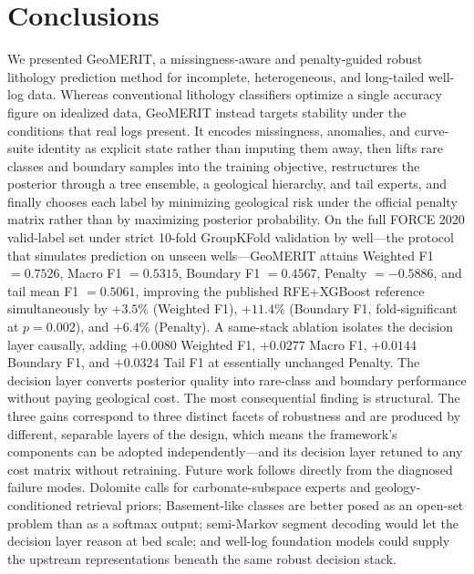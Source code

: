 \documentclass[bdcc,article,submit,pdftex,moreauthors]{Definitions/mdpi}
\begin{document}
\section{Conclusions}
\label{sec:conclusion}
We presented GeoMERIT, a missingness-aware and penalty-guided robust lithology prediction
method for incomplete, heterogeneous, and long-tailed well-log data. Whereas conventional
lithology classifiers optimize a single accuracy figure on idealized data, GeoMERIT instead
targets stability under the conditions that real logs present. It encodes missingness,
anomalies, and curve-suite identity as explicit state rather than imputing them away, then
lifts rare classes and boundary samples into the training objective, restructures the posterior
through a tree ensemble, a geological hierarchy, and tail experts, and finally chooses each
label by minimizing geological risk under the official penalty matrix rather than by maximizing
posterior probability. On the full FORCE 2020 valid-label set under strict
10-fold GroupKFold validation by well---the protocol that simulates prediction on unseen
wells---GeoMERIT attains Weighted F1 $=0.7526$, Macro F1 $=0.5315$, Boundary F1 $=0.4567$,
Penalty $=-0.5886$, and tail mean F1 $=0.5061$, improving the published RFE+XGBoost
reference simultaneously by $+3.5\%$ (Weighted F1), $+11.4\%$ (Boundary F1, fold-significant
at $p=0.002$), and $+6.4\%$ (Penalty). A same-stack ablation isolates the decision layer
causally, adding $+0.0080$ Weighted F1, $+0.0277$ Macro F1, $+0.0144$ Boundary F1, and $+0.0324$
Tail F1 at essentially unchanged Penalty. The decision layer converts posterior quality
into rare-class and boundary performance without paying geological cost. The most
consequential finding is structural. The three gains correspond to three distinct facets of
robustness and are produced by different, separable layers of the design, which means the
framework's components can be adopted independently---and its decision layer retuned to any
cost matrix without retraining. Future work follows directly from the diagnosed failure
modes. Dolomite calls for carbonate-subspace experts and geology-conditioned retrieval priors;
Basement-like classes are better posed as an open-set problem than as a softmax output;
semi-Markov segment decoding would let the decision layer reason at bed scale; and well-log
foundation models could supply the upstream representations beneath the same robust decision
stack.

\vspace{6pt}

\end{document}
